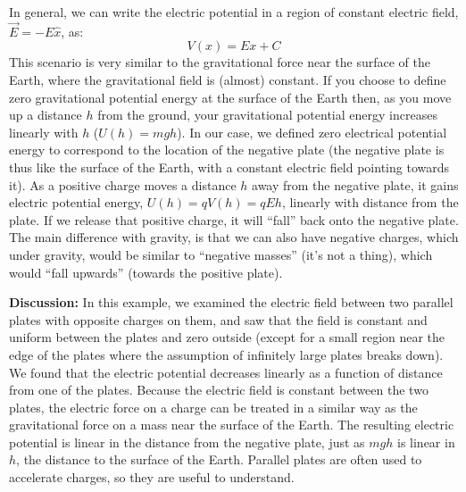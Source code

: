 \begin{framed}
\begin{framed}
In general, we can write the electric potential in a region of constant electric field, $\vec E= -E\hat x$, as:
\begin{equation}
V(x)=Ex + C
\end{equation}
This scenario is very similar to the gravitational force near the surface of the Earth, where the gravitational field is (almost) constant. If you choose to define zero gravitational potential energy at the surface of the Earth then, as you move up a distance $h$ from the ground, your gravitational potential energy increases linearly with $h$ ($U(h)=mgh$). In our case, we defined zero electrical potential energy to correspond to the location of the negative plate (the negative plate is thus like the surface of the Earth, with a constant electric field pointing towards it). As a positive charge moves a distance $h$ away from the negative plate, it gains electric potential energy, $U(h)=qV(h)=qEh$, linearly with distance from the plate. If we release that positive charge, it will ``fall'' back onto the negative plate. The main difference with gravity, is that we can also have negative charges, which under gravity, would be similar to ``negative masses'' (it's not a thing), which would ``fall upwards'' (towards the positive plate).

\textbf{Discussion:} In this example, we examined the electric field between two parallel plates with opposite charges on them, and saw that the field is constant and uniform between the plates and zero outside (except for a small region near the edge of the plates where the assumption of infinitely large plates breaks down). We found that the electric potential decreases linearly as a function of distance from one of the plates. Because the electric field is constant between the two plates, the electric force on a charge can be treated in a similar way as the gravitational force on a mass near the surface of the Earth. The resulting electric potential is linear in the distance from the negative plate, just as $mgh$ is linear in $h$, the distance to the surface of the Earth. Parallel plates are often used to accelerate charges, so they are useful to understand.
\end{framed}
\end{framed}

